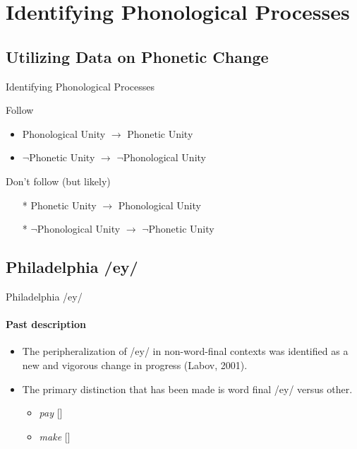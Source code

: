 \documentclass[]{beamer}
\begin{document}
\section{Identifying Phonological Processes}

\subsection{Utilizing Data on Phonetic Change}

\begin{frame}{Identifying Phonological Processes}

	\begin{block}{Follow}
		\begin{itemize}
			\item Phonological Unity $\rightarrow$ Phonetic Unity
			\item $\neg$Phonetic Unity $\rightarrow$ $\neg$Phonological Unity
		\end{itemize}
	\end{block}
	
	\begin{block}{Don't follow (but likely)}
		\begin{itemize}
			\item [*] Phonetic Unity $\rightarrow$ Phonological Unity
			\item [*] $\neg$Phonological Unity $\rightarrow$ $\neg$Phonetic Unity
		\end{itemize}
	\end{block}
\end{frame}



\subsection{Philadelphia /ey/}

\begin{frame}{Philadelphia /ey/}
	\framesubtitle{Past description}

			\begin{itemize}
				\item The peripheralization of /ey/ in non-word-final contexts was identified as
						a new and vigorous change in progress (Labov, 2001).
				\item The primary distinction that has been made is word final /ey/ versus other.
					\begin{itemize}
						\item {\it pay} []
						\item {\it make} []
					\end{itemize}
			\end{itemize}
\end{frame}
\end{document}
